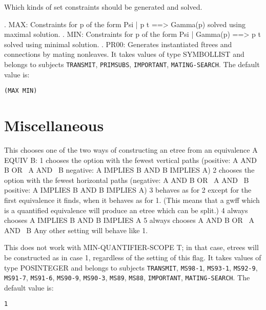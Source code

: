 \begin{description}
\item[WHICH-CONSTRAINTS]  
Which kinds of set constraints should be generated and solved.

. MAX:  Constraints for p of the form Psi | p t ==> Gamma(p)
        solved using maximal solution.
. MIN:  Constraints for p of the form Psi | Gamma(p) ==> p t
        solved using minimal solution.
. PR00: Generates instantiated ftrees and connections by mating
        nonleaves.
It takes values of type SYMBOLLIST and belongs to subjects \texttt{TRANSMIT}, \texttt{PRIMSUBS}, \texttt{IMPORTANT}, \texttt{MATING-SEARCH}.  The default value is: \begin{lstlisting}
(MAX MIN)
\end{lstlisting}

\item
\end{description}

\section{Miscellaneous}

\begin{description} 
\item[REWRITE-EQUIVS]  
This chooses one of the two ways of constructing an etree
from an equivalence A EQUIV B:
1 chooses the option with the fewest vertical paths
   (positive: A AND B OR ~A AND ~B
    negative: A IMPLIES B AND B IMPLIES A)
2 chooses the option with the fewest horizontal paths
   (negative: A AND B OR ~A AND ~B
    positive: A IMPLIES B AND B IMPLIES A)
3 behaves as for 2 except for the first equivalence it finds, 
  when it behaves as for 1. (This means that a gwff which is a 
  quantified equivalence will produce an etree which can be split.)
4 always chooses A IMPLIES B AND B IMPLIES A
5 always chooses A AND B OR ~A AND ~B
Any other setting will behave like 1.

This does not work with MIN-QUANTIFIER-SCOPE T; in that case, 
etrees will be constructed as in case 1, regardless of the setting
of this flag.
It takes values of type POSINTEGER and belongs to subjects \texttt{TRANSMIT}, \texttt{MS98-1}, \texttt{MS93-1}, \texttt{MS92-9}, \texttt{MS91-7}, \texttt{MS91-6}, \texttt{MS90-9}, \texttt{MS90-3}, \texttt{MS89}, \texttt{MS88}, \texttt{IMPORTANT}, \texttt{MATING-SEARCH}.  The default value is: \begin{lstlisting}
1
\end{lstlisting}

\item
\end{description}

